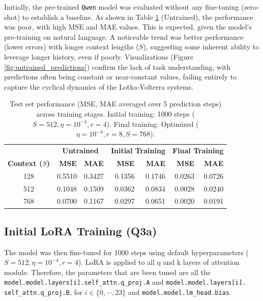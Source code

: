 \documentclass{article}
\begin{document}
Initially, the pre-trained \texttt{Qwen} model was evaluated without any fine-tuning (zero-shot) to establish a baseline. As shown in Table \ref{tab:training_stage_comparison} (Untrained), the performance was poor, with high MSE and MAE values. This is expected, given the model's pre-training on natural language. A noticeable trend was better performance (lower errors) with longer context lengths ($S$), suggesting some inherent ability to leverage longer history, even if poorly. Visualizations (Figure \ref{fig:untrained_predictions}) confirm the lack of task understanding, with predictions often being constant or near-constant values, failing entirely to capture the cyclical dynamics of the Lotka-Volterra systems.

\begin{table}[!htbp] %
\renewcommand{\arraystretch}{1.4} \centering \setlength{\tabcolsep}{8pt}
\begin{tabular}{@{}c rr rr rr@{}} %
    \toprule
    & \multicolumn{2}{c}{\textbf{Untrained}}
    & \multicolumn{2}{c}{\textbf{Initial Training}}
    & \multicolumn{2}{c}{\textbf{Final Training}} \\
    \cmidrule(lr){2-3} \cmidrule(lr){4-5} \cmidrule(lr){6-7}
    \textbf{Context ($S$)} & \textbf{MSE} & \textbf{MAE} & \textbf{MSE} & \textbf{MAE} & \textbf{MSE} & \textbf{MAE} \\ \midrule
    128 & 0.5510 & 0.3427 & 0.1356 & 0.1746 & 0.0263 & 0.0726 \\ %
    512 & 0.1048 & 0.1509 & 0.0362 & 0.0834 & 0.0028 & 0.0240 \\
    768 & 0.0700 & 0.1167 & 0.0297 & 0.0651 & 0.0020 & 0.0191 \\
    \bottomrule
\end{tabular}
\caption{Test set performance (MSE, MAE averaged over 5 prediction steps) across training stages. Initial training: 1000 steps ($S=512, \eta=10^{-4}, r=4$). Final training: Optimized ($\eta=10^{-4}, r=8, S=768$).} %
\label{tab:training_stage_comparison}
\end{table}


\subsection{Initial LoRA Training (Q3a)}

The model was then fine-tuned for 1000 steps using default hyperparameters ($S=512, \eta=10^{-4}, r=4$). LoRA is applied to all q and k layers of attention module. Therefore, the parameters that are been tuned are all the \texttt{model.model.layers[i].self\_attn.q\_proj.A} and \texttt{model.model.layers[i]. self\_attn.q\_proj.B}, for $i \in \{0, \cdots, 23\}$ and \texttt{model.model.lm\_head.bias}.
\end{document}
